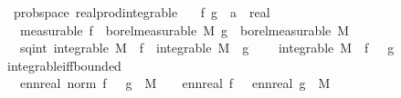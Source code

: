 \begin{isabellebody}
\isanewline
{}\isamarkupfalse%
\ {\isacharparenleft}{\kern0pt}\ prob{\isacharunderscore}{\kern0pt}space{\isacharparenright}{\kern0pt}\ real{\isacharunderscore}{\kern0pt}prod{\isacharunderscore}{\kern0pt}integrable{\isacharcolon}{\kern0pt}\isanewline
\ \ \ f\ g\ {\isacharcolon}{\kern0pt}{\isacharcolon}{\kern0pt}\ {\isachardoublequoteopen}{\isacharprime}{\kern0pt}a\ {\isasymRightarrow}\ real{\isachardoublequoteclose}\isanewline
\ \ \ {\isacharbrackleft}{\kern0pt}measurable{\isacharbrackright}{\kern0pt}{\isacharcolon}{\kern0pt}\ {\isachardoublequoteopen}f\ {\isasymin}\ borel{\isacharunderscore}{\kern0pt}measurable\ M{\isachardoublequoteclose}\ {\isachardoublequoteopen}g\ {\isasymin}\ borel{\isacharunderscore}{\kern0pt}measurable\ M{\isachardoublequoteclose}\isanewline
\ \ \ sq{\isacharunderscore}{\kern0pt}int{\isacharcolon}{\kern0pt}\ {\isachardoublequoteopen}integrable\ M\ {\isacharparenleft}{\kern0pt}{\isasymlambda}{\isasymomega}{\isachardot}{\kern0pt}\ f\ {\isasymomega}{\isacharcircum}{\kern0pt}{}{\isacharparenright}{\kern0pt}{\isachardoublequoteclose}\ {\isachardoublequoteopen}integrable\ M\ {\isacharparenleft}{\kern0pt}{\isasymlambda}{\isasymomega}{\isachardot}{\kern0pt}\ g\ {\isasymomega}{\isacharcircum}{\kern0pt}{}{\isacharparenright}{\kern0pt}{\isachardoublequoteclose}\isanewline
\ \ \ {\isachardoublequoteopen}integrable\ M\ {\isacharparenleft}{\kern0pt}{\isasymlambda}{\isasymomega}{\isachardot}{\kern0pt}\ f\ {\isasymomega}\ {\isacharasterisk}{\kern0pt}\ g\ {\isasymomega}{\isacharparenright}{\kern0pt}{\isachardoublequoteclose}\isanewline
%
\isadelimproof
\ \ %
\endisadelimproof
%
\isatagproof
{}\isamarkupfalse%
\ integrable{\isacharunderscore}{\kern0pt}iff{\isacharunderscore}{\kern0pt}bounded\isanewline
{}\isamarkupfalse%
\isanewline
\ \ \isamarkupfalse%
\ {\isachardoublequoteopen}{\isacharparenleft}{\kern0pt}{\isasymintegral}\isactrlsup {\isacharplus}{\kern0pt}\ {\isasymomega}{\isachardot}{\kern0pt}\ ennreal\ {\isacharparenleft}{\kern0pt}norm\ {\isacharparenleft}{\kern0pt}f\ {\isasymomega}\ {\isacharasterisk}{\kern0pt}\ g\ {\isasymomega}{\isacharparenright}{\kern0pt}{\isacharparenright}{\kern0pt}\ {\isasympartial}M{\isacharparenright}{\kern0pt}\ {\isacharequal}{\kern0pt}\ {\isacharparenleft}{\kern0pt}{\isasymintegral}\isactrlsup {\isacharplus}{\kern0pt}\ {\isasymomega}{\isachardot}{\kern0pt}\ ennreal\ {\isasymbar}f\ {\isasymomega}{\isasymbar}\ {\isacharasterisk}{\kern0pt}\ ennreal\ {\isasymbar}g\ {\isasymomega}{\isasymbar}\ {\isasympartial}M{\isacharparenright}{\kern0pt}\ \isanewline

\end{isabellebody}
